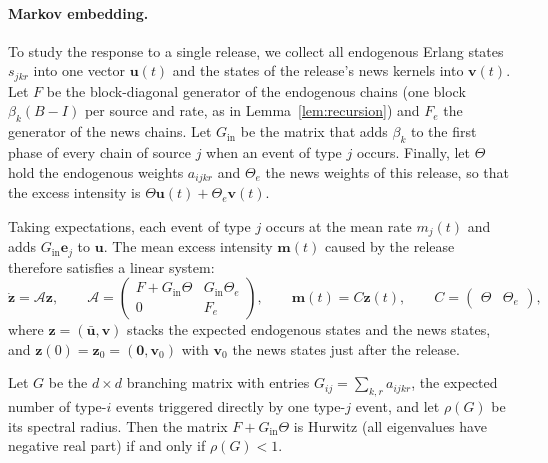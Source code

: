 \paragraph{Markov embedding.} To study the response to a single release, we collect all
endogenous Erlang states $s_{jkr}$ into one vector $\bm u(t)$ and the states of the release's
news kernels into $\bm v(t)$. Let $F$ be the block-diagonal generator of the endogenous chains
(one block $\beta_k(B-I)$ per source and rate, as in Lemma~\ref{lem:recursion}) and $F_e$ the
generator of the news chains. Let $G_{\mathrm{in}}$ be the matrix that adds $\beta_k$ to the first
phase of every chain of source $j$ when an event of type $j$ occurs. Finally, let $\Theta$ hold the
endogenous weights $a_{ijkr}$ and $\Theta_e$ the news weights of this release, so that the excess
intensity is $\Theta\bm u(t)+\Theta_e\bm v(t)$.

Taking expectations, each event of type $j$ occurs at the mean rate $m_j(t)$ and adds
$G_{\mathrm{in}}\bm e_j$ to $\bm u$. The mean excess intensity $\bm m(t)$ caused by the release
therefore satisfies a linear system:
\begin{equation}\label{eq:embedding}
\dot{\bm z}=\mathcal A\bm z,\qquad
\mathcal A=\begin{pmatrix}F+G_{\mathrm{in}}\Theta & G_{\mathrm{in}}\Theta_e\\ 0 & F_e\end{pmatrix},\qquad
\bm m(t)=C\bm z(t),\qquad C=\begin{pmatrix}\Theta&\Theta_e\end{pmatrix},
\end{equation}
where $\bm z=(\bar{\bm u},\bm v)$ stacks the expected endogenous states and the news states, and
$\bm z(0)=\bm z_0=(\bm 0,\bm v_0)$ with $\bm v_0$ the news states just after the release.

\begin{theorem}[Stability]\label{thm:stab}
Let $G$ be the $d\times d$ branching matrix with entries $G_{ij}=\sum_{k,r}a_{ijkr}$, the expected
number of type-$i$ events triggered directly by one type-$j$ event, and let $\rho(G)$ be its
spectral radius. Then the matrix $F+G_{\mathrm{in}}\Theta$ is Hurwitz (all eigenvalues have negative
real part) if and only if $\rho(G)<1$.
\end{theorem}

